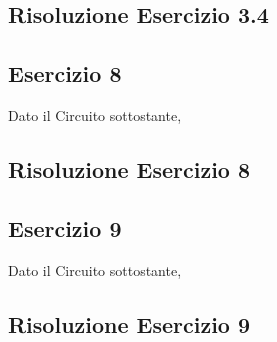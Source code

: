 \documentclass[\main/main.tex]{subfiles}
\begin{document}
\clearpage
\subsection{Risoluzione Esercizio 3.4}
\clearpage
\subsection{Esercizio 8}
Dato il Circuito sottostante,

\clearpage
\subsection{Risoluzione Esercizio 8}
\clearpage
\subsection{Esercizio 9}
Dato il Circuito sottostante,

\clearpage
\subsection{Risoluzione Esercizio 9}
\end{document}
